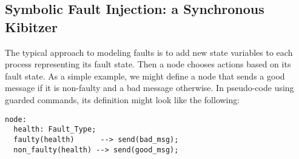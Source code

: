 \documentclass{llncs/llncs}
\begin{document}




\subsection{Symbolic Fault Injection: a Synchronous Kibitzer}\label{sec:kibitzer}
The typical approach to modeling faults is to add new state variables to each process representing its fault state. Then a node chooses actions based on its fault state. As a simple example, we might define a node that sends a good message if it is non-faulty and a bad message otherwise. In pseudo-code using guarded commands, its definition might look like the following:

\small
\begin{verbatim}
node:
  health: Fault_Type;
  faulty(health)      --> send(bad_msg);
  non_faulty(health) --> send(good_msg);
\end{verbatim}
\normalsize
\end{document}

